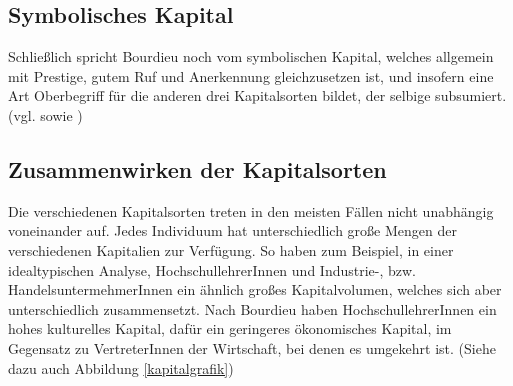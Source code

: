 \documentclass[a4paper, german, oneside]{scrbook}
\begin{document}
\subsection{Symbolisches Kapital}
Schließlich spricht Bourdieu noch vom symbolischen Kapital, welches allgemein mit Prestige, gutem Ruf und Anerkennung gleichzusetzen ist, und insofern eine Art Oberbegriff für die anderen drei Kapitalsorten bildet, der selbige subsumiert. (vgl. \cite[540]{joas_sozialtheorie:_2004} sowie \cite[87]{luthje_medium_2008})

\subsection{Zusammenwirken der Kapitalsorten}
Die verschiedenen Kapitalsorten treten in den meisten Fällen nicht unabhängig voneinander auf. Jedes Individuum hat unterschiedlich große Mengen der verschiedenen Kapitalien zur Verfügung. So haben zum Beispiel, in einer idealtypischen Analyse, HochschullehrerInnen und Industrie-, bzw. HandelsuntermehmerInnen ein ähnlich großes Kapitalvolumen, welches sich aber unterschiedlich zusammensetzt. Nach Bourdieu haben HochschullehrerInnen ein hohes kulturelles Kapital, dafür ein geringeres ökonomisches Kapital, im Gegensatz zu VertreterInnen der Wirtschaft, bei denen es umgekehrt ist. (Siehe dazu auch Abbildung \ref{kapitalgrafik}) \parencite[vgl.][541]{joas_sozialtheorie:_2004}
\end{document}
